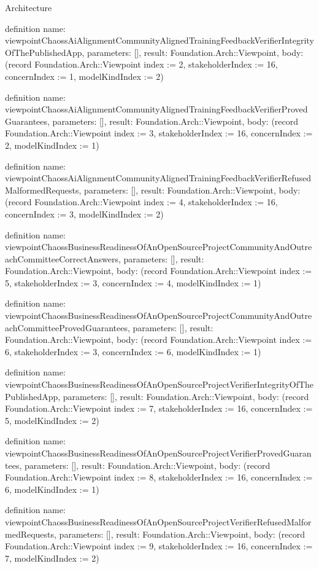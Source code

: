 \begin{lexlean}{Architecture}
\begin{semanticmodule}
definition{
  name: viewpointChaossAiAlignmentCommunityAlignedTrainingFeedbackVerifierIntegrityOfThePublishedApp,
  parameters: [],
  result: Foundation.Arch::Viewpoint,
  body: (record Foundation.Arch::Viewpoint {index := 2, stakeholderIndex := 16, concernIndex := 1, modelKindIndex := 2})
}

definition{
  name: viewpointChaossAiAlignmentCommunityAlignedTrainingFeedbackVerifierProvedGuarantees,
  parameters: [],
  result: Foundation.Arch::Viewpoint,
  body: (record Foundation.Arch::Viewpoint {index := 3, stakeholderIndex := 16, concernIndex := 2, modelKindIndex := 1})
}

definition{
  name: viewpointChaossAiAlignmentCommunityAlignedTrainingFeedbackVerifierRefusedMalformedRequests,
  parameters: [],
  result: Foundation.Arch::Viewpoint,
  body: (record Foundation.Arch::Viewpoint {index := 4, stakeholderIndex := 16, concernIndex := 3, modelKindIndex := 2})
}

definition{
  name: viewpointChaossBusinessReadinessOfAnOpenSourceProjectCommunityAndOutreachCommitteeCorrectAnswers,
  parameters: [],
  result: Foundation.Arch::Viewpoint,
  body: (record Foundation.Arch::Viewpoint {index := 5, stakeholderIndex := 3, concernIndex := 4, modelKindIndex := 1})
}

definition{
  name: viewpointChaossBusinessReadinessOfAnOpenSourceProjectCommunityAndOutreachCommitteeProvedGuarantees,
  parameters: [],
  result: Foundation.Arch::Viewpoint,
  body: (record Foundation.Arch::Viewpoint {index := 6, stakeholderIndex := 3, concernIndex := 6, modelKindIndex := 1})
}

definition{
  name: viewpointChaossBusinessReadinessOfAnOpenSourceProjectVerifierIntegrityOfThePublishedApp,
  parameters: [],
  result: Foundation.Arch::Viewpoint,
  body: (record Foundation.Arch::Viewpoint {index := 7, stakeholderIndex := 16, concernIndex := 5, modelKindIndex := 2})
}

definition{
  name: viewpointChaossBusinessReadinessOfAnOpenSourceProjectVerifierProvedGuarantees,
  parameters: [],
  result: Foundation.Arch::Viewpoint,
  body: (record Foundation.Arch::Viewpoint {index := 8, stakeholderIndex := 16, concernIndex := 6, modelKindIndex := 1})
}

definition{
  name: viewpointChaossBusinessReadinessOfAnOpenSourceProjectVerifierRefusedMalformedRequests,
  parameters: [],
  result: Foundation.Arch::Viewpoint,
  body: (record Foundation.Arch::Viewpoint {index := 9, stakeholderIndex := 16, concernIndex := 7, modelKindIndex := 2})
}


\end{semanticmodule}
\end{lexlean}
